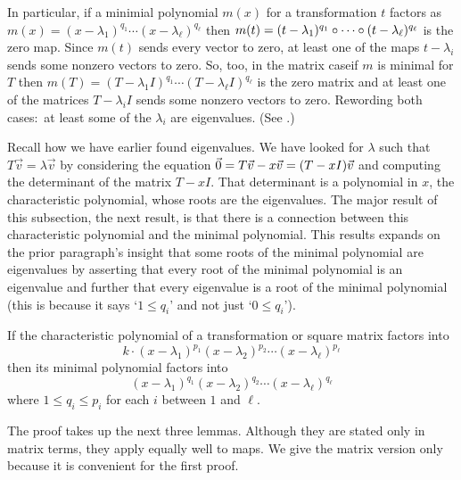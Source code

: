 In particular, if a minimial polynomial $m(x)$ for a transformation $t$ 
factors as
$m(x)=(x-\lambda_1)^{q_1}\cdots (x-\lambda_\ell)^{q_\ell}$
then 
\( m(t)=(t-\lambda_1)^{q_1}\mathbin\circ \cdots\mathbin\circ 
      (t-\lambda_\ell)^{q_\ell} \) 
is the zero map. 
Since \( m(t) \) sends every vector to zero, at least
one of the maps \( t-\lambda_i \)  sends some
nonzero vectors to zero.
So, too, in the matrix case\Dash if $m$ is minimal for $T$ then
\( m(T)=(T-\lambda_1I)^{q_1}\cdots (T-\lambda_\ell I)^{q_\ell} \)
is the zero matrix and at least one of the matrices $T-\lambda_iI$
sends some nonzero vectors to zero. 
Rewording both cases:~at least some of the \( \lambda_i \) are eigenvalues.
(See .)

Recall how we have earlier found eigenvalues.
We have looked for $\lambda$ such that $T\vec{v}=\lambda\vec{v}$ by considering
the equation $\vec{0}=T\vec{v}-x\vec{v}=(T-xI)\vec{v}$
and computing the determinant of the matrix $T-xI$.
That determinant is a polynomial in $x$, 
the characteristic polynomial, 
whose roots are the eigenvalues.
The major result of this subsection, the next result, is that 
there is a connection between this characteristic polynomial
and the minimal polynomial.
This results expands on the prior paragraph's insight that some roots of the
minimal polynomial are eigenvalues by asserting that
every root of the minimal polynomial is an eigenvalue and further
that every eigenvalue is a root of the minimal polynomial 
(this is because it says `$1\leq q_i$' and 
not just `$0\leq q_i$').

\begin{theorem}
\label{th:CayHam}
\hspace*{0em plus2em}
If the characteristic polynomial of a transformation or square matrix
factors into
\begin{equation*}
  k\cdot (x-\lambda_1)^{p_1}(x-\lambda_2)^{p_2}\cdots(x-\lambda_\ell)^{p_\ell}
\end{equation*}
then its minimal polynomial factors into
\begin{equation*}
  (x-\lambda_1)^{q_1}(x-\lambda_2)^{q_2}\cdots(x-\lambda_\ell)^{q_\ell}
\end{equation*}
where \( 1\leq q_i \leq p_i \) for each \( i \) between \( 1 \) and \( \ell \).
\end{theorem}

\noindent The proof takes up the next three lemmas.
Although they are stated only in matrix terms, they apply equally
well to maps.
We give the matrix version only because it is convenient for the first proof.

